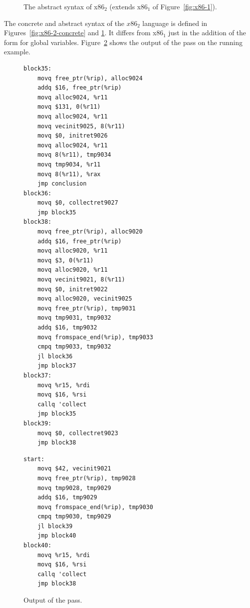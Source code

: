 \documentclass[11pt]{book}
\newcommand{\gray}[1]{{\color{gray} #1}}
\begin{document}
\begin{figure}[tp]
\fbox{
  \begin{minipage}{0.96\textwidth}
    \small
\[
\begin{array}{lcl}
  \Arg &::=&  \gray{  \INT{\Int} \mid \REG{\Reg} \mid \DEREF{\Reg}{\Int}
   \mid \BYTEREG{\Reg}} \\
   &\mid& (\key{Global}~\Var) \\
x86_2 &::= & \gray{ \PROGRAM{\itm{info}}{\CFG{\key{(}\itm{label} \,\key{.}\, \Block \key{)}\ldots}} }
\end{array}
\]
\end{minipage}
}
\caption{The abstract syntax of x86$_2$ (extends x86$_1$ of Figure~\ref{fig:x86-1}).}
\label{fig:x86-2}
\end{figure}

The concrete and abstract syntax of the $x86_2$ language is defined in
Figures~\ref{fig:x86-2-concrete} and \ref{fig:x86-2}.  It differs from
x86$_1$ just in the addition of the form for global variables.
%
Figure~\ref{fig:select-instr-output-gc} shows the output of the
 pass on the running example.

\begin{figure}[tbp]
\centering
\begin{minipage}[t]{0.5\textwidth}
\begin{lstlisting}[basicstyle=\ttfamily\scriptsize]
block35:
    movq free_ptr(%rip), alloc9024
    addq $16, free_ptr(%rip)
    movq alloc9024, %r11
    movq $131, 0(%r11)
    movq alloc9024, %r11
    movq vecinit9025, 8(%r11)
    movq $0, initret9026
    movq alloc9024, %r11
    movq 8(%r11), tmp9034
    movq tmp9034, %r11
    movq 8(%r11), %rax
    jmp conclusion
block36:
    movq $0, collectret9027
    jmp block35
block38:
    movq free_ptr(%rip), alloc9020
    addq $16, free_ptr(%rip)
    movq alloc9020, %r11
    movq $3, 0(%r11)
    movq alloc9020, %r11
    movq vecinit9021, 8(%r11)
    movq $0, initret9022
    movq alloc9020, vecinit9025
    movq free_ptr(%rip), tmp9031
    movq tmp9031, tmp9032
    addq $16, tmp9032
    movq fromspace_end(%rip), tmp9033
    cmpq tmp9033, tmp9032
    jl block36
    jmp block37
block37:
    movq %r15, %rdi
    movq $16, %rsi
    callq 'collect
    jmp block35
block39:
    movq $0, collectret9023
    jmp block38
\end{lstlisting}
\end{minipage}
\begin{minipage}[t]{0.45\textwidth}
\begin{lstlisting}[basicstyle=\ttfamily\scriptsize]
start:
    movq $42, vecinit9021
    movq free_ptr(%rip), tmp9028
    movq tmp9028, tmp9029
    addq $16, tmp9029
    movq fromspace_end(%rip), tmp9030
    cmpq tmp9030, tmp9029
    jl block39
    jmp block40
block40:
    movq %r15, %rdi
    movq $16, %rsi
    callq 'collect
    jmp block38
\end{lstlisting}
\end{minipage}
\caption{Output of the  pass.}
\label{fig:select-instr-output-gc}
\end{figure}
\end{document}

